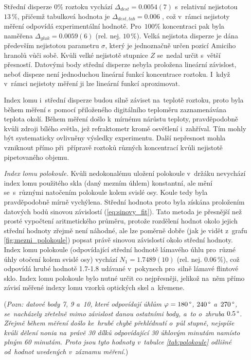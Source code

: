 \documentclass{../concepts/titul_protokol_p/prepareprotokol} %
\begin{document}
Střední disperze $0\%$ roztoku
vychází $\Delta_{dest} = 0.0054(7)$ s~relativní nejistotou $13\,\%$, přičemž tabulková hodnota je 
$\Delta_{dest,tab} = 0.006$ \cite{mikulcak}, což v~rámci nejistoty měření odpovídá experimentální hodnotě.
Pro~$100\%$ koncentraci pak byla naměřena $\Delta_{gluk} = 0.0059(6)$ (rel. nej. $10\,\%$). 
Velká nejistota disperze je dána především nejistotou parametru $\sigma$, který je jednoznačně určen pozicí 
Amiciho hranolů vůči sobě. Kvůli velké nejistotě stupnice $Z$ se~nedal určit s~větší přesností.
Datovými body střední disperze nebyla
proložena lineární závislost, neboť dispeze není jednoduchou lineární funkcí koncentrace roztoku. I~když 
v~rámci nejistoty měření ji lze lineární funkcí aproximovat.

Index lomu i~střední disperze budou silně záviset na~teplotě roztoku, proto byla během měření s~pomocí přiloženého
digitálního teploměru zaznamenávána teplota okolí. Během měření došlo k~mírnému nárůstu teploty, pravděpodobně
kvůli zdroji bílého světla, jež refraktometr kromě osvětlení i~zahříval. Tím mohly být systematicky ovlivněny
výsledky experimentu. Další nepřesnost mohla vzniknout přímo při~přípravě roztoků různých koncentrací kvůli 
nejistotě pipetovaného objemu.

\textit{Index lomu polokoule.} Kvůli nedokonalému uložení polokoule v~držáku nevychází index lomu použitého
skla (daný mezním úhlem) konstantní, ale mění se~s~různými natočením polokoule kolem svislé osy. Koule tedy
byla pravděpodobně mírně vychýlena. Střední hodnota proto byla získána proložením datových bodů sinovou 
závislostí (\ref{eq:sinovy_fit}).
Tato metoda je přesnější než prosté vypočtení aritmetického průměru, protože rozdělení
hodnot okolo jejich střední hodnoty zřejmě není náhodné, ale lze poměrně dobře (jak je vidět z~grafu 
\ref{fig:mezni_polokoule}) popsat právě sinovou závislostí okolo střední hodnoty. Index lomu polokoule (odpovídající
střední hodnotě lámavého úhlu pro~různé úhly otočení kolem svislé osy) vychází $N_1 = 1.7489(10)$ 
(rel. nej. $0.06\,\%$), což odpovídá
hrubé hodnotě 1.7-1.8 udávané v~pokynech \cite{pokyny} pro~silně lámavé flintové sklo. Index lomu polokoule bylo nutné
určit co nejpřesněji, jelikož na~něm přímo závisí měřené indexy lomu vzorků optických skel a~křemene.

(\textit{Pozn: datové body 7, 9 a~10, které odpovídají úhlům $\varphi = 180\,\degree$, $240\,\degree$ a~$270\,\degree$,
se~nacházely zřetelně mimo závislost danou ostatními body, a~to o~zhruba $0.5\,\degree$. Zřejmě během měření
došlo ke~hrubé chybě přehlédnutí o~půl stupně, nejspíše kvůli dělení nonia na~právě 30 dílků odpovídající 30
ůhlovým minutám namísto plným 60 minutám. Proto jsou tyto hodnoty v~tabulce \ref{tab:polokoule} odlišné 
od~hodnot uvedených v~záznamu měření.})
\end{document}
